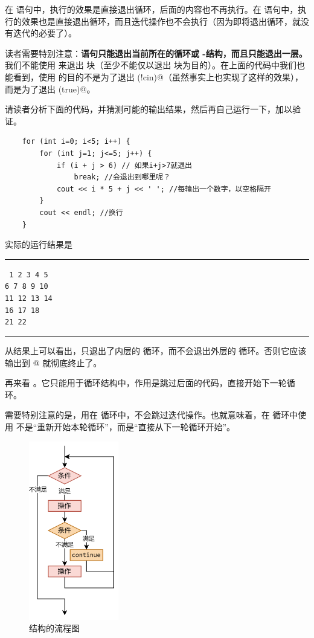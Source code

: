 在 \lstinline@while@ 语句中，\lstinline@break@ 执行的效果是直接退出循环，后面的内容也不再执行。在 \lstinline@for@ 语句中，\lstinline@break@ 执行的效果也是直接退出循环，而且迭代操作也不会执行（因为即将退出循环，就没有迭代的必要了）。\par
读者需要特别注意：\textbf{\lstinline@break@ 语句只能退出当前所在的循环或 \lstinline@switch@-\lstinline@case@ 结构，而且只能退出一层。}我们不能使用 \lstinline@break@ 来退出 \lstinline@if@ 块（至少不能仅以退出 \lstinline@if@ 块为目的）。在上面的代码中我们也能看到，使用 \lstinline@break@ 的目的不是为了退出 \lstinline@if(!cin)@（虽然事实上也实现了这样的效果），而是为了退出 \lstinline@while(true)@。\par
请读者分析下面的代码，并猜测可能的输出结果，然后再自己运行一下，加以验证。
\begin{lstlisting}
    for (int i=0; i<5; i++) {
        for (int j=1; j<=5; j++) {
            if (i + j > 6) // 如果i+j>7就退出
                break; //会退出到哪里呢？
            cout << i * 5 + j << ' '; //每输出一个数字，以空格隔开
        }
        cout << endl; //换行
    }
\end{lstlisting}
实际的运行结果是\\\noindent\rule{\linewidth}{0.2pt}\texttt{
1 2 3 4 5\\
6 7 8 9 10\\
11 12 13 14\\
16 17 18\\
21 22
}\\\noindent\rule{\linewidth}{0.2pt}
从结果上可以看出，\lstinline@break@ 只退出了内层的 \lstinline@for@ 循环，而不会退出外层的 \lstinline@for@ 循环。否则它应该输出到 @ 就彻底终止了。\par
再来看 \lstinline@continue@。它只能用于循环结构中，作用是跳过后面的代码，直接开始下一轮循环。\par
需要特别注意的是，\lstinline@continue@ 用在 \lstinline@for@ 循环中，不会跳过迭代操作。也就意味着，在 \lstinline@for@ 循环中使用 \lstinline@continue@ 不是``重新开始本轮循环''，而是``直接从下一轮循环开始''。\par
\begin{figure}[htbp]
   \centering
   \includegraphics[width=0.35\textwidth]{../images/generalized_parts/03_structure_of_continue_300.png}
   \caption{\lstinline@continue@ 结构的流程图}
\end{figure}
